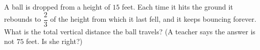 A ball is dropped from a height of $15$ feet. Each time it hits the ground it rebounds to $\dfrac{2}{3}$ of the height from which it last fell, and it keeps bouncing forever. What is the total vertical distance the ball travels? (A teacher says the answer is not $75$ feet. Is she right?)
